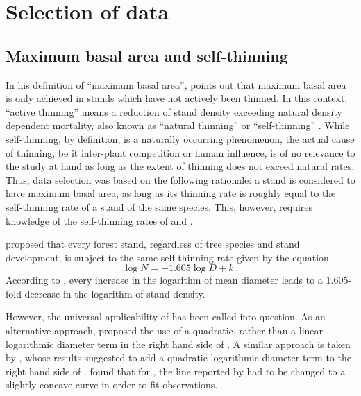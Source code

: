 \section{Selection of data}

\subsection{Maximum basal area and self-thinning}

In his definition of ``maximum basal area'', \textcite{Assmann1970} points out that maximum basal area is only achieved in stands which have not actively been thinned.  In this context, ``active thinning'' means a reduction of stand density exceeding natural density dependent mortality, also known as ``natural thinning'' \parencite{SAF1958} or ``self-thinning'' \parencite{Roehrig1992}.  While self-thinning, by definition, is a naturally occurring phenomenon, the actual cause of thinning, be it inter-plant competition or human influence, is of no relevance to the study at hand as long as the extent of thinning does not exceed natural rates.  Thus, data selection was based on the following rationale: a stand is considered to have maximum basal area, as long as its thinning rate is roughly equal to the self-thinning rate of a stand of the same species.  This, however, requires knowledge of the self-thinning rates of \beech{} and \spruce{}.

\textcite{Reineke1933} proposed that every forest stand, regardless of tree species and stand development, is subject to the same self-thinning rate given by the equation
\begin{equation}
  \label{eq:reineke}
  \log N = -1.605 \log D + k ~.
\end{equation}
According to , every increase in the logarithm of mean diameter leads to a \num{1.605}-fold decrease in the logarithm of stand density.

However, the universal applicability of  has been called into question.  As an alternative approach, \textcite{Charru2012} proposed the use of a quadratic, rather than a linear logarithmic diameter term in the right hand side of . A similar approach is taken by \textcite{Schuetz2008,Schuetz2010,Zeide1995}, whose results suggested to add a quadratic logarithmic diameter term to the right hand side of .  \textcite{Meyer1938} found that for \ponderosa{}, the line reported by \textcite{Reineke1933} had to be changed to a slightly concave curve in order to fit observations.  

